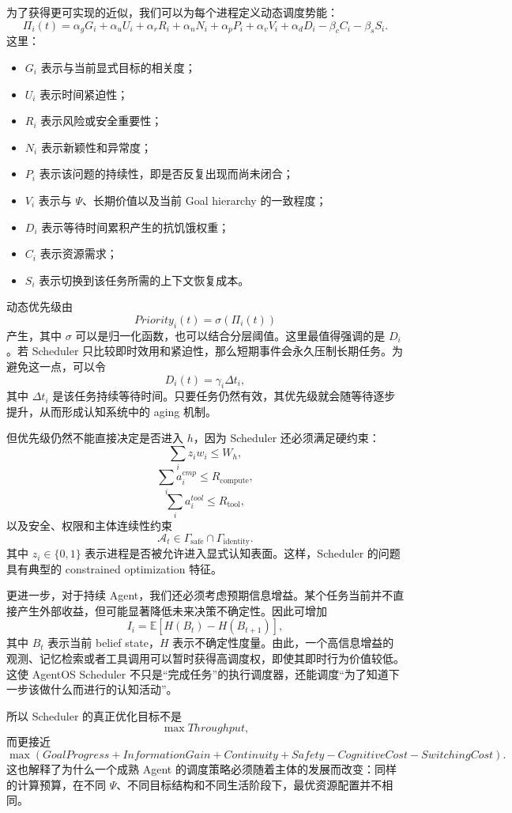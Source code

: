 为了获得更可实现的近似，我们可以为每个进程定义动态调度势能：
\[
\Pi_i(t)
=
\alpha_g G_i
+
\alpha_u U_i
+
\alpha_r R_i
+
\alpha_n N_i
+
\alpha_p P_i
+
\alpha_v V_i
+
\alpha_d D_i
-
\beta_c C_i
-
\beta_s S_i.
\]
这里：
\begin{itemize}
\item $G_i$ 表示与当前显式目标的相关度；
\item $U_i$ 表示时间紧迫性；
\item $R_i$ 表示风险或安全重要性；
\item $N_i$ 表示新颖性和异常度；
\item $P_i$ 表示该问题的持续性，即是否反复出现而尚未闭合；
\item $V_i$ 表示与 $\Psi$、长期价值以及当前 Goal hierarchy 的一致程度；
\item $D_i$ 表示等待时间累积产生的抗饥饿权重；
\item $C_i$ 表示资源需求；
\item $S_i$ 表示切换到该任务所需的上下文恢复成本。
\end{itemize}

动态优先级由
\[
Priority_i(t)=\sigma(\Pi_i(t))
\]
产生，其中 $\sigma$ 可以是归一化函数，也可以结合分层阈值。这里最值得强调的是 $D_i$。若 Scheduler 只比较即时效用和紧迫性，那么短期事件会永久压制长期任务。为避免这一点，可以令
\[
D_i(t)=\gamma_i\Delta t_i,
\]
其中 $\Delta t_i$ 是该任务持续等待时间。只要任务仍然有效，其优先级就会随等待逐步提升，从而形成认知系统中的 aging 机制。

但优先级仍然不能直接决定是否进入 $h$，因为 Scheduler 还必须满足硬约束：
\[
\sum_i z_i w_i\leq W_h,
\]
\[
\sum_i a_i^{cmp}\leq R_{\mathrm{compute}},
\]
\[
\sum_i a_i^{tool}\leq R_{\mathrm{tool}},
\]
以及安全、权限和主体连续性约束
\[
\mathcal A_t\in\Gamma_{\mathrm{safe}}\cap\Gamma_{\mathrm{identity}}.
\]
其中 $z_i\in\{0,1\}$ 表示进程是否被允许进入显式认知表面。这样，Scheduler 的问题具有典型的 constrained optimization 特征。

更进一步，对于持续 Agent，我们还必须考虑预期信息增益。某个任务当前并不直接产生外部收益，但可能显著降低未来决策不确定性。因此可增加
\[
I_i
=
\mathbb E[
H(B_t)-H(B_{t+1})
],
\]
其中 $B_t$ 表示当前 belief state，$H$ 表示不确定性度量。由此，一个高信息增益的观测、记忆检索或者工具调用可以暂时获得高调度权，即使其即时行为价值较低。这使 AgentOS Scheduler 不只是“完成任务”的执行调度器，还能调度“为了知道下一步该做什么而进行的认知活动”。

所以 Scheduler 的真正优化目标不是
\[
\max Throughput,
\]
而更接近
\[
\boxed{
\max
\left(
GoalProgress
+
InformationGain
+
Continuity
+
Safety
-
CognitiveCost
-
SwitchingCost
\right).
}
\]
这也解释了为什么一个成熟 Agent 的调度策略必须随着主体的发展而改变：同样的计算预算，在不同 $\Psi$、不同目标结构和不同生活阶段下，最优资源配置并不相同。

